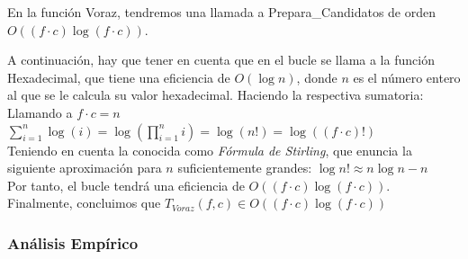 \documentclass[a4paper,12pt,twoside]{article} %
\begin{document}
En la función Voraz, tendremos una llamada a Prepara\_Candidatos de orden $O((f \cdot {c}) \log{(f \cdot{c})})$. 


A continuación, hay que tener en cuenta que en el bucle se llama a la función Hexadecimal, que tiene una eficiencia de $O(\log{n})$, donde $n$ es el número entero al que se le calcula su valor hexadecimal. Haciendo la respectiva sumatoria:\\

Llamando a $f \cdot c=n$\\

$\sum_{i=1}^{n} \log{(i)} =
\log{(\prod_{i=1}^{n} {i})} = \log{(n!)} = \log{((f \cdot{c})!)}$\\

Teniendo en cuenta la conocida como \textit{Fórmula de Stirling}, que enuncia la siguiente aproximación para $n$ suficientemente grandes: $\log{n!} \approx n\log{n} - n$\\

Por tanto, el bucle tendrá una eficiencia de $O((f \cdot {c}) \log{(f \cdot{c})})$.\\

Finalmente, concluimos que $T_{Voraz}(f,c) \in O((f\cdot{c}) \log{(f\cdot{c})})$


\newpage
\subsubsection{Análisis Empírico}
\end{document}
